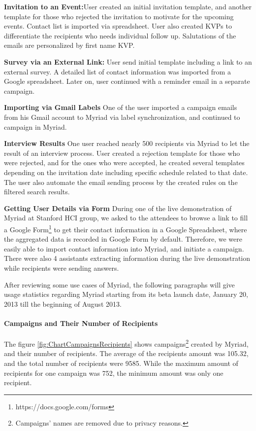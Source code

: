 \begin{compactitem}
	\item \textbf{Invitation to an Event:}User created an initial invitation template, and another template for those who rejected the invitation to motivate for the upcoming events.  Contact list is imported via spreadsheet. User also created \ac{KVP}s to differentiate the recipients who needs individual follow up. Salutations of the emails are personalized by first name \ac{KVP}.
	\item \textbf{Survey via an External Link:} User send initial template including a link to an external survey. A detailed list of contact information was imported from a Google spreadsheet. Later on, user continued with a reminder email in a separate campaign.
	\item \textbf{Importing via Gmail Labels} One of the user imported a campaign emails from his Gmail account to Myriad via label synchronization, and continued to campaign in Myriad.
	\item \textbf{Interview Results} One user reached nearly 500 recipients via Myriad to let the result of an interview process. User created a rejection template for those who were rejected, and for the ones who were accepted, he created several templates depending on the invitation date including specific schedule related to that date. The user also automate the email sending process by the created rules on the filtered search results.
	\item \textbf{Getting User Details via Form} During one of the live demonstration of Myriad at Stanford \ac{HCI} group, we asked to the attendees to browse a link to fill a Google Form\footnote{https://docs.google.com/forms} to get their contact information in a Google Spreadsheet, where the aggregated data is recorded in Google Form by default. Therefore, we were easily able to import contact information into Myriad, and initiate a campaign. There were also 4 assistants extracting information during the live demonstration while recipients were sending answers.
\end{compactitem}
\vspace{1cm}

After reviewing some use cases of Myriad, the following paragraphs will give usage statistics regarding Myriad starting from its beta launch date, January 20, 2013 till the beginning of August 2013.

\paragraph{Campaigns and Their Number of Recipients} The figure \ref{fig:ChartCampaignsRecipients} shows campaigns\footnote{Campaigns' names are removed due to privacy reasons.} created by Myriad, and their number of recipients. The average of the recipients amount was 105.32, and the total number of recipients were 9585. While the maximum amount of recipients for one campaign was 752, the minimum amount was only one recipient.

